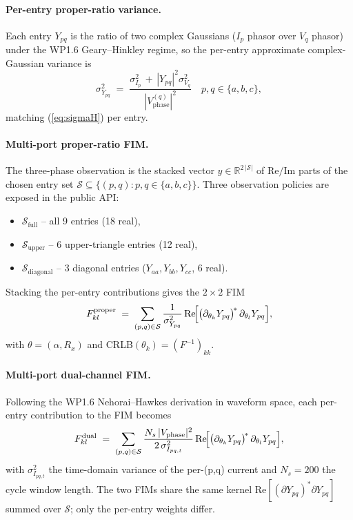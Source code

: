 \documentclass[11pt,a4paper]{article}
\begin{document}
\paragraph{Per-entry proper-ratio variance.}
Each entry $Y_{pq}$ is the ratio of two complex Gaussians
($I_p$ phasor over $V_q$ phasor) under the WP1.6 Geary--Hinkley
regime, so the per-entry approximate complex-Gaussian variance is
\begin{equation}
\sigma_{Y_{pq}}^{2} \;=\;
   \frac{\sigma_{I_{p}}^{2}\,+\,|Y_{pq}|^{2}\sigma_{V_{q}}^{2}}
        {|V_{\mathrm{phase}}^{(q)}|^{2}}
\quad p,q\in\{a,b,c\},
\label{eq:sigmaYpq}
\end{equation}
matching (\ref{eq:sigmaH}) per entry.

\paragraph{Multi-port proper-ratio FIM.}
The three-phase observation is the stacked vector
$y\in\mathbb{R}^{2\,|\mathcal{S}|}$ of $\mathrm{Re}/\mathrm{Im}$
parts of the chosen entry set
$\mathcal{S}\subseteq\{(p,q):p,q\in\{a,b,c\}\}$.  Three observation
policies are exposed in the public API:
\begin{itemize}[leftmargin=2em]
  \item $\mathcal{S}_{\mathrm{full}}$ -- all 9 entries (18 real),
  \item $\mathcal{S}_{\mathrm{upper}}$ -- 6 upper-triangle entries
        (12 real),
  \item $\mathcal{S}_{\mathrm{diagonal}}$ -- 3 diagonal entries
        ($Y_{aa},Y_{bb},Y_{cc}$, 6 real).
\end{itemize}
Stacking the per-entry contributions gives the $2\times 2$ FIM
\begin{equation}
F^{\mathrm{proper}}_{kl} \;=\;
   \sum_{(p,q)\in\mathcal{S}}
   \frac{1}{\sigma_{Y_{pq}}^{2}}\,
   \mathrm{Re}\!\Bigl[
     \bigl(\partial_{\theta_k} Y_{pq}\bigr)^{\!*}\,
     \partial_{\theta_l} Y_{pq}
   \Bigr],
\label{eq:FproperMulti}
\end{equation}
with $\theta=(\alpha,R_x)$ and CRLB$(\theta_k) = (F^{-1})_{kk}$.

\paragraph{Multi-port dual-channel FIM.}
Following the WP1.6 Nehorai--Hawkes derivation in waveform space,
each per-entry contribution to the FIM becomes
\begin{equation}
F^{\mathrm{dual}}_{kl} \;=\;
   \sum_{(p,q)\in\mathcal{S}}
   \frac{N_{s}\,|V_{\mathrm{phase}}|^{2}}{2\,\sigma_{I_{pq,t}}^{2}}\,
   \mathrm{Re}\!\Bigl[
     \bigl(\partial_{\theta_k} Y_{pq}\bigr)^{\!*}\,
     \partial_{\theta_l} Y_{pq}
   \Bigr],
\label{eq:FdualMulti}
\end{equation}
with $\sigma_{I_{pq,t}}^{2}$ the time-domain variance of the per-(p,q)
current and $N_s=200$ the cycle window length.  The two FIMs share
the same kernel $\mathrm{Re}[(\partial Y_{pq})^{*}\partial Y_{pq}]$
summed over $\mathcal{S}$; only the per-entry weights differ.
\end{document}

